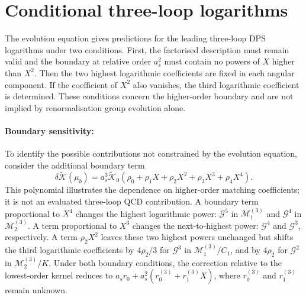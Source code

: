 \documentclass[%
 onecolumn,
 superscriptaddress,
 preprintnumbers,
 nofootinbib,
 amsmath,amssymb,
 aps,
 prl,
]{revtex4-2}
\newcommand{\G}{\mathcal G}
\newcommand{\M}{\mathcal M}
\begin{document}
\section{Conditional three-loop logarithms}
\label{sec:threeloop}

The evolution equation gives predictions
for the leading three-loop DPS logarithms
under two conditions. First, the
factorised description must remain
valid and the boundary at relative
order $a_s^2$ must contain no powers
of $X$ higher than $X^2$.
Then the two highest logarithmic
coefficients are fixed in each
angular component.
%
If the coefficient of $X^2$
also vanishes, the third logarithmic
coefficient is determined.
These conditions concern the
higher-order boundary and are
not implied by renormalisation
group evolution alone.

\paragraph{Boundary sensitivity: }
To identify the possible contributions
not constrained by the evolution
equation, consider the additional
boundary term
\begin{equation}
\delta\widetilde{\mathcal K}(\mu_b)
=a_s^3\widetilde{\mathcal K}_0
(\rho_0+\rho_1X+\rho_2X^2+\rho_3X^3+\rho_4X^4).
\label{eq:boundaryhigher}
\end{equation}
This polynomial illustrates the
dependence on higher-order matching
coefficients; it is not an evaluated
three-loop QCD contribution.
%
A boundary term proportional to $X^4$
changes the highest logarithmic power:
$\G^5$ in $\M_1^{(3)}$ and
$\G^4$ in $\M_2^{(3)}$.
A term proportional to $X^3$ changes
the next-to-highest power:
$\G^4$ and $\G^3$, respectively.
%
A term $\rho_2X^2$ leaves these two
highest powers unchanged but shifts
the third logarithmic coefficients
by $4\rho_2/3$ for $\G^3$ in
$\M_1^{(3)}/C_1$, and by $4\rho_2$
for $\G^2$ in $\M_2^{(3)}/K$.
%
Under both boundary conditions,
the correction relative to the
lowest-order kernel reduces to
$a_sr_0+a_s^2(r_0^{(3)}+r_1^{(3)}X)$,
where $r_0^{(3)}$ and
$r_1^{(3)}$ remain unknown.
\end{document}
